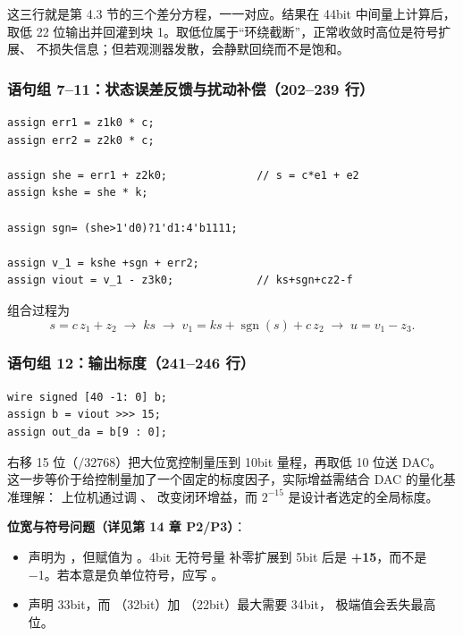 这三行就是第 4.3 节的三个差分方程，一一对应。结果在 44bit 中间量上计算后，
取低 22 位输出并回灌到块 1。取低位属于“环绕截断”，正常收敛时高位是符号扩展、
不损失信息；但若观测器发散，会静默回绕而不是饱和。

\subsubsection{语句组 7--11：状态误差反馈与扰动补偿（202--239 行）}

\begin{lstlisting}[style=vsnip]
assign err1 = z1k0 * c;
assign err2 = z2k0 * c;

assign she = err1 + z2k0;              // s = c*e1 + e2
assign kshe = she * k;

assign sgn= (she>1'd0)?1'd1:4'b1111;

assign v_1 = kshe +sgn + err2;
assign viout = v_1 - z3k0;             // ks+sgn+cz2-f
\end{lstlisting}

组合过程为
\begin{equation}
s = c\,z_1 + z_2 \;\rightarrow\; ks \;\rightarrow\; v_1 = ks + \operatorname{sgn}(s) + c\,z_2
\;\rightarrow\; u = v_1 - z_3 .
\end{equation}

\subsubsection{语句组 12：输出标度（241--246 行）}

\begin{lstlisting}[style=vsnip]
wire signed [40 -1: 0] b;
assign b = viout >>> 15;
assign out_da = b[9 : 0];
\end{lstlisting}

右移 15 位（$/32768$）把大位宽控制量压到 10bit 量程，再取低 10 位送 DAC。
这一步等价于给控制量加了一个固定的标度因子，实际增益需结合 DAC 的量化基准理解：
上位机通过调 、 改变闭环增益，而 $2^{-15}$ 是设计者选定的全局标度。

\begin{warnbox}
\textbf{位宽与符号问题（详见第 14 章 P2/P3）}：
\begin{itemize}[leftmargin=1.2em,itemsep=1pt]
\item {} 声明为 ，但赋值为 。4bit 无符号量
      补零扩展到 5bit 后是 \textbf{+15}，而不是 −1。若本意是负单位符号，应写 。
\item {} 声明 33bit，而 （32bit）加 （22bit）最大需要 34bit，
      极端值会丢失最高位。
\end{itemize}
\end{warnbox}

